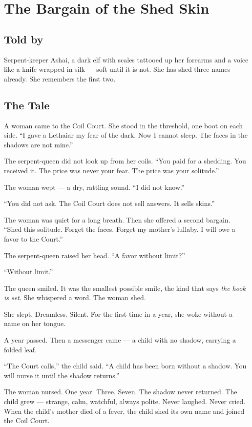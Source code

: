 \chapter{The Bargain of the Shed Skin}

\section*{Told by}
Serpent-keeper Ashai, a dark elf with scales tattooed up her forearms and a voice like a knife wrapped in silk --- soft until it is not. She has shed three names already. She remembers the first two.

\section*{The Tale}

A woman came to the Coil Court. She stood in the threshold, one boot on each side. ``I gave a Lethaiar my fear of the dark. Now I cannot sleep. The faces in the shadows are not mine.''

The serpent-queen did not look up from her coils. ``You paid for a shedding. You received it. The price was never your fear. The price was your solitude.''

The woman wept --- a dry, rattling sound. ``I did not know.''

``You did not ask. The Coil Court does not sell answers. It sells skins.''

The woman was quiet for a long breath. Then she offered a second bargain. ``Shed this solitude. Forget the faces. Forget my mother's lullaby. I will owe a favor to the Court.''

The serpent-queen raised her head. ``A favor without limit?''

``Without limit.''

The queen smiled. It was the smallest possible smile, the kind that says \textit{the hook is set}. She whispered a word. The woman shed.

She slept. Dreamless. Silent. For the first time in a year, she woke without a name on her tongue.

A year passed. Then a messenger came --- a child with no shadow, carrying a folded leaf.

``The Court calls,'' the child said. ``A child has been born without a shadow. You will nurse it until the shadow returns.''

The woman nursed. One year. Three. Seven. The shadow never returned. The child grew --- strange, calm, watchful, always polite. Never laughed. Never cried. When the child's mother died of a fever, the child shed its own name and joined the Coil Court.

